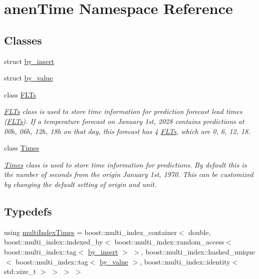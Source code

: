 \hypertarget{namespaceanen_time}{}\section{anen\+Time Namespace Reference}
\label{namespaceanen_time}
\subsection*{Classes}
\begin{DoxyCompactItemize}
\item 
struct \mbox{\hyperlink{structanen_time_1_1by__insert}{by\+\_\+insert}}
\item 
struct \mbox{\hyperlink{structanen_time_1_1by__value}{by\+\_\+value}}
\item 
class \mbox{\hyperlink{classanen_time_1_1_f_l_ts}{F\+L\+Ts}}
\begin{DoxyCompactList}\small\item\em \mbox{\hyperlink{classanen_time_1_1_f_l_ts}{F\+L\+Ts}} class is used to store time information for prediction forecast lead times (\mbox{\hyperlink{classanen_time_1_1_f_l_ts}{F\+L\+Ts}}). If a temperature forecast on January 1st, 2028 contains predictions at 00h, 06h, 12h, 18h on that day, this forecast has 4 \mbox{\hyperlink{classanen_time_1_1_f_l_ts}{F\+L\+Ts}}, which are 0, 6, 12, 18. \end{DoxyCompactList}\item 
class \mbox{\hyperlink{classanen_time_1_1_times}{Times}}
\begin{DoxyCompactList}\small\item\em \mbox{\hyperlink{classanen_time_1_1_times}{Times}} class is used to store time information for predictions. By default this is the number of seconds from the origin January 1st, 1970. This can be customized by changing the default setting of origin and unit. \end{DoxyCompactList}\end{DoxyCompactItemize}
\subsection*{Typedefs}
\begin{DoxyCompactItemize}
\item 
using \mbox{\hyperlink{namespaceanen_time_af2da8a18b50eb82edcc7b36e2a6b6441}{multi\+Index\+Times}} = boost\+::multi\+\_\+index\+\_\+container$<$ double, boost\+::multi\+\_\+index\+::indexed\+\_\+by$<$ boost\+::multi\+\_\+index\+::random\+\_\+access$<$ boost\+::multi\+\_\+index\+::tag$<$ \mbox{\hyperlink{structanen_time_1_1by__insert}{by\+\_\+insert}} $>$ $>$, boost\+::multi\+\_\+index\+::hashed\+\_\+unique$<$ boost\+::multi\+\_\+index\+::tag$<$ \mbox{\hyperlink{structanen_time_1_1by__value}{by\+\_\+value}} $>$, boost\+::multi\+\_\+index\+::identity$<$ std\+::size\+\_\+t $>$ $>$ $>$ $>$
\end{DoxyCompactItemize}

